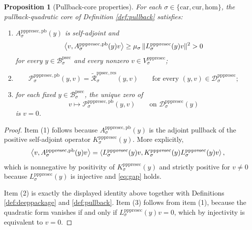 \documentclass[11pt]{article}
\newcommand{\Car}{\mathrm{car}}
\newcommand{\Cur}{\mathrm{cur}}
\newcommand{\Hom}{\mathrm{hom}}
\newcommand{\ProtoSectionBody}[1]{\mathcal B_{#1}^{\mathrm{psec}}}
\newcommand{\PrePreProtoSectionVertical}[1]{V_{#1}^{\mathrm{pppresec}}}
\newcommand{\PrePreProtoSectionResidualBody}[1]{\mathcal D_{#1}^{\mathrm{pppresec}}}
\newcommand{\PrePreProtoSectionResponseMap}[1]{L_{#1}^{\mathrm{pppresec}}}
\newcommand{\PrePreProtoSectionOperator}[1]{K_{#1}^{\mathrm{pppresec}}}
\newcommand{\InducedResidualFunctional}[1]{\widetilde{\mathscr R}_{#1}^{\mathrm{ppsec,res}}}
\newcommand{\PrePreProtoSectionPullbackOperator}[1]{A_{#1}^{\mathrm{pppresec,pb}}}
\newcommand{\PrePreProtoSectionPullbackFunctional}[1]{\mathscr P_{#1}^{\mathrm{pppresec,pb}}}
\newtheorem{proposition}{Proposition}
\begin{document}
\begin{proposition}[Pullback-core properties]
\label{prop:pullback}
For each \(\sigma\in\{\Car,\Cur,\Hom\}\), the pullback-quadratic core of Definition \ref{def:pullback} satisfies:
\begin{enumerate}
    \item \(\PrePreProtoSectionPullbackOperator{\sigma}(y)\) is self-adjoint and
    \[
    \ev{v,\PrePreProtoSectionPullbackOperator{\sigma}(y)v}
    \ge
    \mu_{\sigma}\,\| \PrePreProtoSectionResponseMap{\sigma}(y)v \|^{2}
    >0
    \]
    for every \(y\in\ProtoSectionBody{\sigma}\) and every nonzero \(v\in\PrePreProtoSectionVertical{\sigma}\);
    \item
    \[
    \PrePreProtoSectionPullbackFunctional{\sigma}(y,v)
    =
    \InducedResidualFunctional{\sigma}(y,v)
    \qquad
    \text{for every }(y,v)\in\PrePreProtoSectionResidualBody{\sigma};
    \]
    \item for each fixed \(y\in\ProtoSectionBody{\sigma}\), the unique zero of
    \[
    v\mapsto \PrePreProtoSectionPullbackFunctional{\sigma}(y,v)
    \qquad
    \text{on }
    \PrePreProtoSectionResidualBody{\sigma}(y)
    \]
    is \(v=0\).
\end{enumerate}
\end{proposition}

\begin{proof}
Item (1) follows because \(\PrePreProtoSectionPullbackOperator{\sigma}(y)\) is the adjoint pullback of the positive self-adjoint operator \(\PrePreProtoSectionOperator{\sigma}(y)\). More explicitly,
\[
\ev{v,\PrePreProtoSectionPullbackOperator{\sigma}(y)v}
=
\ev{
\PrePreProtoSectionResponseMap{\sigma}(y)v,
\PrePreProtoSectionOperator{\sigma}(y)
\PrePreProtoSectionResponseMap{\sigma}(y)v
},
\]
which is nonnegative by positivity of \(\PrePreProtoSectionOperator{\sigma}(y)\) and strictly positive for \(v\neq 0\) because \(\PrePreProtoSectionResponseMap{\sigma}(y)\) is injective and \eqref{eq:gap} holds.

Item (2) is exactly the displayed identity above together with Definitions \ref{def:deeppackage} and \ref{def:pullback}. Item (3) follows from item (1), because the quadratic form vanishes if and only if \(\PrePreProtoSectionResponseMap{\sigma}(y)v=0\), which by injectivity is equivalent to \(v=0\).
\end{proof}
\end{document}
